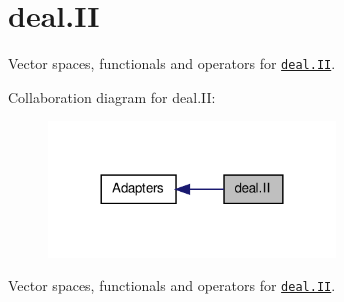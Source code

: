 \hypertarget{group__dealIIGroup}{\section{deal.\-I\-I}
\label{group__dealIIGroup}
}


\-Vector spaces, functionals and operators for \href{http://www.dealii.org}{\tt deal.\-I\-I}.  


\-Collaboration diagram for deal.\-I\-I\-:
\nopagebreak
\begin{figure}[H]
\begin{center}
\leavevmode
\includegraphics[width=216pt]{group__dealIIGroup}
\end{center}
\end{figure}
\-Vector spaces, functionals and operators for \href{http://www.dealii.org}{\tt deal.\-I\-I}. 